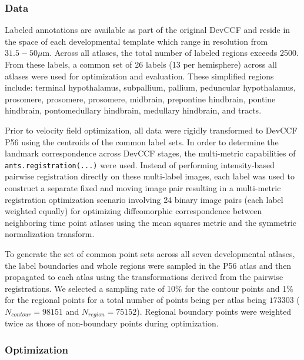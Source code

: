 \documentclass[
  12pt,
]{article}
\begin{document}
\hypertarget{data}{%
\subsubsection{Data}\label{data}}

Labeled annotations are available as part of the original DevCCF and
reside in the space of each developmental template which range in
resolution from \(31.5-50 \mu\)m. Across all atlases, the total number
of labeled regions exceeds 2500. From these labels, a common set of 26
labels (13 per hemisphere) across all atlases were used for optimization
and evaluation. These simplified regions include: terminal hypothalamus,
subpallium, pallium, peduncular hypothalamus, prosomere, prosomere,
prosomere, midbrain, prepontine hindbrain, pontine hindbrain,
pontomedullary hindbrain, medullary hindbrain, and tracts.

Prior to velocity field optimization, all data were rigidly transformed
to DevCCF P56 using the centroids of the common label sets. In order to
determine the landmark correspondence across DevCCF stages, the
multi-metric capabilities of \texttt{ants.registration(...)} were used.
Instead of performing intensity-based pairwise registration directly on
these multi-label images, each label was used to construct a separate
fixed and moving image pair resulting in a multi-metric registration
optimization scenario involving 24 binary image pairs (each label
weighted equally) for optimizing diffeomorphic correspondence between
neighboring time point atlases using the mean squares metric and the
symmetric normalization transform.

To generate the set of common point sets across all seven developmental
atlases, the label boundaries and whole regions were sampled in the P56
atlas and then propagated to each atlas using the transformations
derived from the pairwise registrations. We selected a sampling rate of
10\% for the contour points and 1\% for the regional points for a total
number of points being per atlas being \(173303\)
(\(N_{contour} = 98151\) and \(N_{region}=75152\)). Regional boundary
points were weighted twice as those of non-boundary points during
optimization.

\hypertarget{optimization}{%
\subsubsection{Optimization}\label{optimization}}
\end{document}
